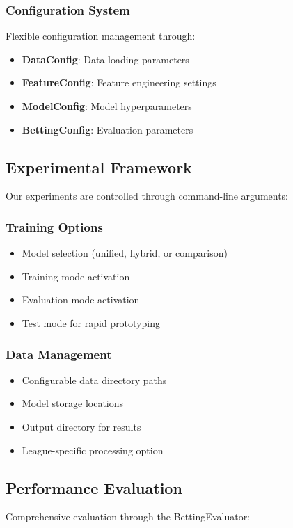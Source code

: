 \documentclass[conference]{IEEEtran}
\begin{document}
\subsubsection{Configuration System}
Flexible configuration management through:
\begin{itemize}
\item \textbf{DataConfig}: Data loading parameters
\item \textbf{FeatureConfig}: Feature engineering settings
\item \textbf{ModelConfig}: Model hyperparameters
\item \textbf{BettingConfig}: Evaluation parameters
\end{itemize}

\subsection{Experimental Framework}
Our experiments are controlled through command-line arguments:

\subsubsection{Training Options}
\begin{itemize}
\item Model selection (unified, hybrid, or comparison)
\item Training mode activation
\item Evaluation mode activation
\item Test mode for rapid prototyping
\end{itemize}

\subsubsection{Data Management}
\begin{itemize}
\item Configurable data directory paths
\item Model storage locations
\item Output directory for results
\item League-specific processing option
\end{itemize}

\subsection{Performance Evaluation}
Comprehensive evaluation through the BettingEvaluator:
\end{document}
